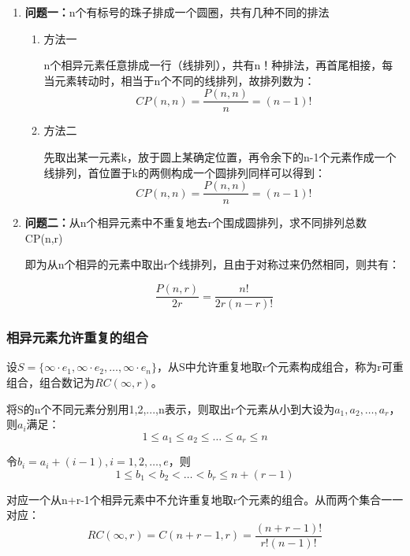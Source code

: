 \documentclass{article}
\begin{document}
\begin{enumerate}
    \item \textbf{问题一：}n个有标号的珠子排成一个圆圈，共有几种不同的排法
    
    \begin{enumerate}
        \item 方法一

        n个相异元素任意排成一行（线排列），共有n！种排法，再首尾相接，每当元素转动时，相当于n个不同的线排列，故排列数为：
        \begin{equation}
            CP(n,n) = \frac{P(n,n)}{n} = (n-1)!
        \end{equation}

        \item 方法二
        
        先取出某一元素k，放于圆上某确定位置，再令余下的n-1个元素作成一个线排列，首位置于k的两侧构成一个圆排列同样可以得到：
        $$
        CP(n,n) = \frac{P(n,n)}{n} = (n-1)!
        $$
    \end{enumerate}

    \item \textbf{问题二：}从n个相异元素中不重复地去r个围成圆排列，求不同排列总数CP(n,r)
    
    即为从n个相异的元素中取出r个线排列，且由于对称过来仍然相同，则共有：

    \begin{equation}
        \frac{P(n,r)}{2r} = \frac{n!}{2r(n-r)!}
    \end{equation}

\end{enumerate}


\subsubsection{相异元素允许重复的组合}

设$S=\{ \infty \cdot e_1,\infty \cdot e_2,\dots,\infty \cdot e_n\}$，从S中允许重复地取r个元素构成组合，称为r可重组合，组合数记为$RC(\infty,r)$。

将S的n个不同元素分别用1,2,...,n表示，则取出r个元素从小到大设为$a_1,a_2,\dots,a_r$，则$a_i$满足：
$$
1 \leq a_1 \leq a_2 \leq \dots \leq a_r\leq n
$$

令$b_i = a_i +(i-1),i=1,2,\dots,e$，则
$$
1 \leq b_1 < b_2 < \dots < b_r \leq n+(r-1)
$$

对应一个从n+r-1个相异元素中不允许重复地取r个元素的组合。从而两个集合一一对应：
$$
RC(\infty,r) = C(n+r-1,r) = \frac{(n+r-1)!}{r!(n-1)!}
$$
\end{document}
